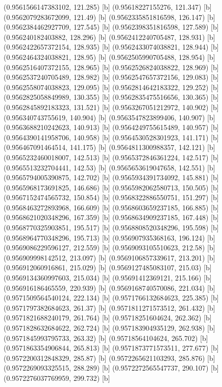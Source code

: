 {{{(0.9561566147383102, 121.285) [b] 
(0.95618227155276, 121.347) [b] 
(0.9562079283672099, 121.49) [b] 
(0.9562335851816598, 126.147) [b] 
(0.9562384462927709, 127.545) [b] 
(0.9562398351816598, 127.589) [b] 
(0.956240182403882, 128.296) [b] 
(0.9562412240705487, 128.931) [b] 
(0.9562422657372154, 128.935) [b] 
(0.9562433074038821, 128.944) [b] 
(0.9562464324038821, 128.95) [b] 
(0.9562505990705488, 128.954) [b] 
(0.9562516407372155, 128.965) [b] 
(0.9562526824038822, 128.969) [b] 
(0.9562537240705489, 128.982) [b] 
(0.9562547657372156, 129.083) [b] 
(0.9562558074038823, 129.095) [b] 
(0.9562814642183322, 129.252) [b] 
(0.9562825058849989, 130.355) [b] 
(0.9562835475516656, 130.365) [b] 
(0.9562845892183323, 131.521) [b] 
(0.9563267051212972, 140.902) [b] 
(0.956340743755619, 140.904) [b] 
(0.9563547823899406, 140.907) [b] 
(0.9563688210242623, 140.913) [b] 
(0.9564249755615489, 140.957) [b] 
(0.9564390141958706, 140.958) [b] 
(0.9564530528301923, 141.171) [b] 
(0.956467091464514, 141.175) [b] 
(0.9564811300988357, 142.121) [b] 
(0.9565232460018007, 142.513) [b] 
(0.9565372846361224, 142.517) [b] 
(0.9565513232704441, 142.53) [b] 
(0.9565653619047658, 142.551) [b] 
(0.9565794005390875, 142.702) [b] 
(0.9565934391734092, 145.881) [b] 
(0.9565968173691825, 146.686) [b] 
(0.9565982062580713, 150.505) [b] 
(0.9567152474565732, 150.854) [b] 
(0.9568322886550751, 151.297) [b] 
(0.9568463272893968, 166.609) [b] 
(0.9568603659237185, 166.885) [b] 
(0.9568621020348296, 167.359) [b] 
(0.9568634909237185, 167.448) [b] 
(0.9568770325903851, 195.517) [b] 
(0.9568808520348296, 195.598) [b] 
(0.9568964770348296, 195.713) [b] 
(0.956907935368163, 196.124) [b] 
(0.9569086229596127, 212.559) [b] 
(0.9569093105510623, 212.58) [b] 
(0.956909998142512, 213.097) [b] 
(0.9569106857339617, 213.201) [b] 
(0.956912060916861, 215.029) [b] 
(0.9569127485083107, 215.03) [b] 
(0.9569134360997603, 215.034) [b] 
(0.95691412369121, 215.166) [b] 
(0.956916186465559, 220.939) [b] 
(0.9569168740570086, 221.034) [b] 
(0.9571509564540124, 222.134) [b] 
(0.9571766132684623, 225.385) [b] 
(0.9571797382684623, 261.37) [b] 
(0.9571811271573512, 261.432) [b] 
(0.9571821688240179, 261.764) [b] 
(0.95718251604624, 262.362) [b] 
(0.9571828632684622, 262.724) [b] 
(0.957183904935129, 262.938) [b] 
(0.9571845993795733, 263.32) [b] 
(0.95718564104624, 265.702) [b] 
(0.9571863354906844, 265.813) [b] 
(0.9571873771573511, 277.677) [b] 
(0.9572200312848329, 285.87) [b] 
(0.9572265621103293, 285.876) [b] 
(0.9572269093325515, 288.289) [b] 
(0.9572272565547737, 290.107) [b] 
(0.9572276037769959, 299.732) [b] 
}}}
